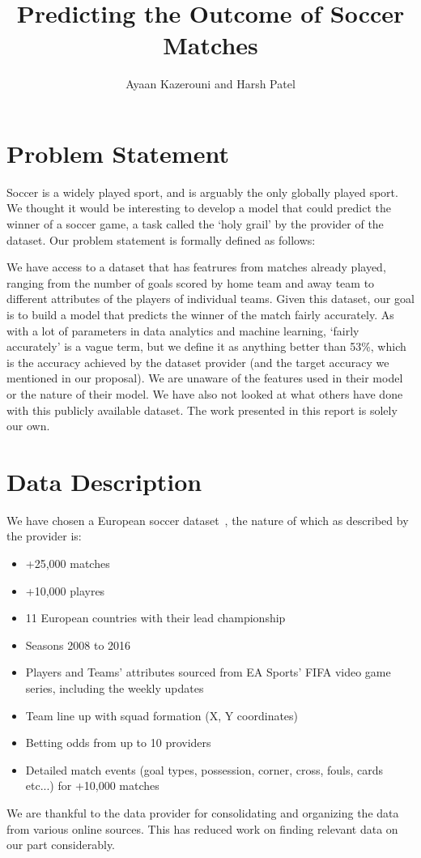 \documentclass[11pt]{article}
\begin{document}
\title{Predicting the Outcome of Soccer Matches}
\author{Ayaan Kazerouni and Harsh Patel}
\date{}
\maketitle

\section{Problem Statement}
Soccer is a widely played sport, and is arguably the only globally played sport.
We thought it would be interesting to develop a model that could predict the winner of a soccer game, a task called the `holy grail' by the provider of the dataset. Our problem statement is formally defined as follows:

We have access to a dataset that has featrures from matches already played, ranging from the number of goals scored by home team and away team to different attributes of the players of individual teams. Given this dataset, our goal is to build a model that predicts the winner of the match fairly accurately.
As with a lot of parameters in data analytics and machine learning, `fairly accurately' is a vague term, but we define it as anything better than 53\%, which is the accuracy achieved by the dataset provider (and the target accuracy we mentioned in our proposal).
We are unaware of the features used in their model or the nature of their model.
We have also not looked at what others have done with this publicly available dataset.
The work presented in this report is solely our own.

\section{Data Description}
\label{sec:data-desc}
We have chosen a European soccer dataset~\cite{mathien1}, the nature of which as described by the provider is:
\begin{itemize}
  \setlength\itemsep{0em}
  \item{+25,000 matches}
  \item{+10,000 playres}
  \item{11 European countries with their lead championship}
  \item{Seasons 2008 to 2016}
  \item{Players and Teams' attributes sourced from EA Sports' FIFA video game series, including the weekly updates}
  \item{Team line up with squad formation (X, Y coordinates)}
  \item{Betting odds from up to 10 providers}
  \item{Detailed match events (goal types, possession, corner, cross, fouls, cards etc...) for +10,000 matches}
\end{itemize}
We are thankful to the data provider for consolidating and organizing the data from various online sources.
This has reduced work on finding relevant data on our part considerably.
\end{document}

